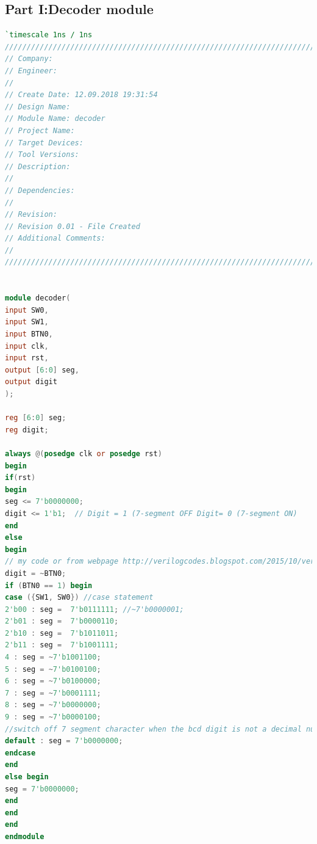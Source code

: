 \subsection{Part I:Decoder module} \label{subsec: Part I: Decoder module}
\begin{lstlisting}[language=verilog,caption={Testbanche decoder part I.},label=lst: Decoder module]
`timescale 1ns / 1ns
//////////////////////////////////////////////////////////////////////////////////
// Company: 
// Engineer: 
// 
// Create Date: 12.09.2018 19:31:54
// Design Name: 
// Module Name: decoder
// Project Name: 
// Target Devices: 
// Tool Versions: 
// Description: 
// 
// Dependencies: 
// 
// Revision:
// Revision 0.01 - File Created
// Additional Comments:
// 
//////////////////////////////////////////////////////////////////////////////////


module decoder(
input SW0,
input SW1,
input BTN0,
input clk,
input rst,
output [6:0] seg,
output digit
);

reg [6:0] seg;
reg digit;

always @(posedge clk or posedge rst)
begin
if(rst)
begin
seg <= 7'b0000000;
digit <= 1'b1;  // Digit = 1 (7-segment OFF Digit= 0 (7-segment ON)
end
else
begin
// my code or from webpage http://verilogcodes.blogspot.com/2015/10/verilog-code-for-bcd-to-7-segment.html
digit = ~BTN0;
if (BTN0 == 1) begin
case ({SW1, SW0}) //case statement
2'b00 : seg =  7'b0111111; //~7'b0000001;
2'b01 : seg =  7'b0000110;
2'b10 : seg =  7'b1011011;
2'b11 : seg =  7'b1001111;
4 : seg = ~7'b1001100;
5 : seg = ~7'b0100100;
6 : seg = ~7'b0100000;
7 : seg = ~7'b0001111;
8 : seg = ~7'b0000000;
9 : seg = ~7'b0000100;
//switch off 7 segment character when the bcd digit is not a decimal number.
default : seg = 7'b0000000; 
endcase
end
else begin
seg = 7'b0000000; 
end  
end
end
endmodule
\end{lstlisting}

